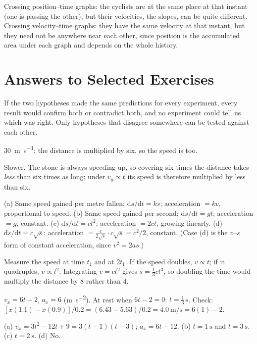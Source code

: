 \documentclass[11pt,twoside,openany]{book}
\newcommand{\dd}{\mathrm{d}}
\begin{document}
\begin{description}[leftmargin=2em,itemsep=2pt]
  \item[2.8] Crossing position--time graphs: the cyclists are at the same place at that instant (one is passing the other), but their velocities, the slopes, can be quite different. Crossing velocity--time graphs: they have the same velocity at that instant, but they need not be anywhere near each other, since position is the accumulated area under each graph and depends on the whole history.
\end{description}

\section*{Answers to Selected Exercises}
\begin{description}[leftmargin=2.6em,itemsep=3pt,style=sameline]
  \item[2.1] If the two hypotheses made the same predictions for every experiment, every result would confirm both or contradict both, and no experiment could tell us which was right. Only hypotheses that disagree somewhere can be tested against each other.
  \item[2.2] \SI{30}{\metre\per\second}: the distance is multiplied by six, so the speed is too.
  \item[2.3] Slower. The stone is always speeding up, so covering six times the distance takes \emph{less} than six times as long; under $v_y \propto t$ its speed is therefore multiplied by less than six.
  \item[2.4] (a) Same speed gained per metre fallen; $\dd s/\dd t = ks$; acceleration $= kv$, proportional to speed. (b) Same speed gained per second; $\dd s/\dd t = gt$; acceleration $= g$, constant. (c) $\dd s/\dd t = ct^2$; acceleration $= 2ct$, growing linearly. (d) $\dd s/\dd t = c\sqrt{s}$; acceleration $= \frac{c}{2\sqrt{s}}\cdot c\sqrt{s} = c^2/2$, constant. (Case (d) is the $v$--$s$ form of constant acceleration, since $v^2 = 2as$.)
  \item[2.5] Measure the speed at time $t_1$ and at $2t_1$. If the speed doubles, $v \propto t$; if it quadruples, $v \propto t^2$. Integrating $v = ct^2$ gives $s = \tfrac13 c t^3$, so doubling the time would multiply the distance by \num{8} rather than \num{4}.
  \item[2.6] $v_x = 6t - 2$, $a_x = 6$ (\si{\metre\per\second\squared}). At rest when $6t - 2 = 0$: $t = \tfrac13\,\si{\second}$. Check: $[x(1.1) - x(0.9)]/0.2 = (6.43 - 5.63)/0.2 = \SI{4.0}{\metre\per\second} = 6(1) - 2$.
  \item[2.7] (a) $v_x = 3t^2 - 12t + 9 = 3(t-1)(t-3)$; $a_x = 6t - 12$. (b) $t = \SI{1}{\second}$ and $t = \SI{3}{\second}$. (c) $t = \SI{2}{\second}$. (d) No.

\end{description}
\end{document}
